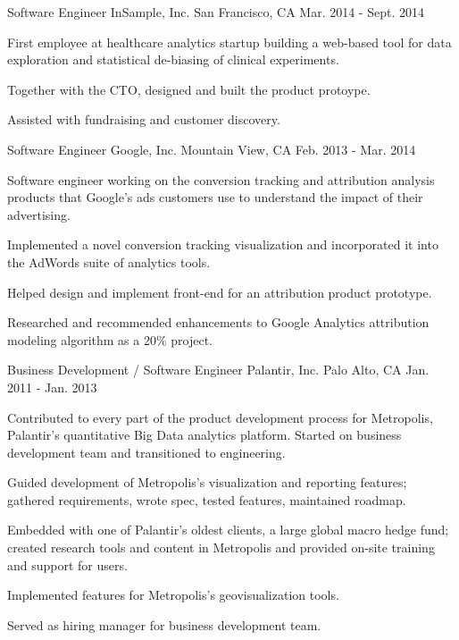 \begin{cventries}
  \cventry
    {Software Engineer} %
    {InSample, Inc.} %
    {San Francisco, CA} %
    {Mar. 2014 - Sept. 2014} %
    {
      \begin{cvitems} %
        \item {First employee at healthcare analytics startup building a web-based tool for data exploration and statistical de-biasing of clinical experiments.}
        \item {Together with the CTO, designed and built the product protoype.}
        \item {Assisted with fundraising and customer discovery.}
      \end{cvitems}
    }

  \cventry
    {Software Engineer} %
    {Google, Inc.} %
    {Mountain View, CA} %
    {Feb. 2013 - Mar. 2014} %
    {
      \begin{cvitems} %
        \item {Software engineer working on the conversion tracking and attribution analysis products that Google’s ads customers use to understand the impact of their advertising.}
        \item {Implemented a novel conversion tracking visualization and incorporated it into the AdWords suite of analytics tools.}
        \item {Helped design and implement front-end for an attribution product prototype.}
        \item {Researched and recommended enhancements to Google Analytics attribution modeling algorithm as a 20\% project.}
      \end{cvitems}
    }

  \cventry
    {Business Development / Software Engineer} %
    {Palantir, Inc.} %
    {Palo Alto, CA} %
    {Jan. 2011 - Jan. 2013} %
    {
      \begin{cvitems} %
        \item {Contributed to every part of the product development process for Metropolis, Palantir’s quantitative Big Data analytics platform. Started on business development team and transitioned to engineering.}
        \item {Guided development of Metropolis’s visualization and reporting features; gathered requirements, wrote spec, tested features, maintained roadmap.}
        \item {Embedded with one of Palantir's oldest clients, a large global macro hedge fund; created research tools and content in Metropolis and provided on-site training and support for users.}
        \item {Implemented features for Metropolis's geovisualization tools.}
        \item {Served as hiring manager for business development team.}
      \end{cvitems}
    }

\end{cventries}
